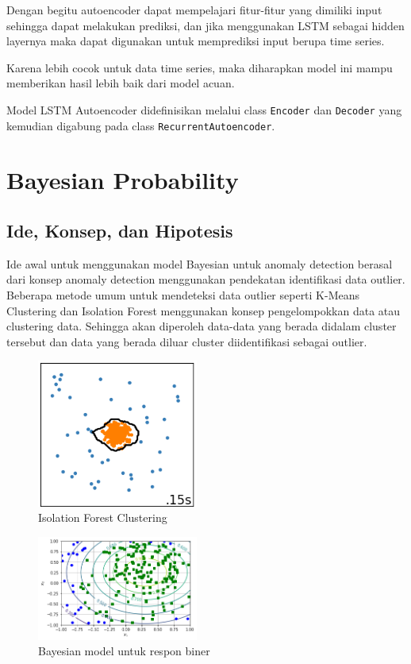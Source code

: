 Dengan begitu autoencoder dapat mempelajari fitur-fitur yang dimiliki input sehingga dapat melakukan prediksi, dan jika menggunakan LSTM sebagai hidden layernya maka dapat digunakan untuk memprediksi input berupa time series.

Karena lebih cocok untuk data time series, maka diharapkan model ini mampu memberikan hasil lebih baik dari model acuan.

Model LSTM Autoencoder didefinisikan melalui class \texttt{Encoder} dan \texttt{Decoder} yang kemudian digabung pada class \texttt{RecurrentAutoencoder}. \cite{lstm}

\section{Bayesian Probability}
\subsection{Ide, Konsep, dan Hipotesis}

Ide awal untuk menggunakan model Bayesian untuk anomaly detection berasal dari konsep anomaly detection menggunakan pendekatan identifikasi data outlier. Beberapa metode umum untuk mendeteksi data outlier seperti K-Means Clustering dan Isolation Forest menggunakan konsep pengelompokkan data atau clustering data. Sehingga akan diperoleh data-data yang berada didalam cluster tersebut dan data yang berada diluar cluster diidentifikasi sebagai outlier.

\begin{figure}[h]
    \centering
    \includegraphics[width=200px]{resources/Bayes/isoforest.png}
    \caption{Isolation Forest Clustering}
\end{figure}

\begin{figure}[h]
    \centering
    \includegraphics[width=200px]{resources/Bayes/bayes_model.png}
    \caption{Bayesian model untuk respon biner}
\end{figure}

